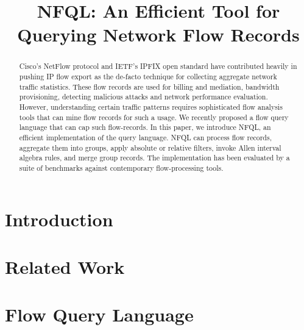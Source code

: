\documentclass[10pt, conference]{IEEEtran}
\begin{document}
\title{NFQL: An Efficient Tool for Querying Network Flow Records}
\author{ }

\maketitle

\begin{acronym}
\end{acronym}


\begin{abstract} Cisco's NetFlow protocol and IETF's IPFIX open standard have
  contributed heavily in pushing IP flow export as the de-facto technique for
  collecting aggregate network traffic statistics. These flow records are used
  for billing and mediation, bandwidth provisioning, detecting malicious
  attacks and network performance evaluation. However, understanding certain
  traffic patterns requires sophisticated flow analysis tools that can mine
  flow records for such a usage. We recently proposed a flow query language
  that can cap such flow-records. In this paper, we introduce NFQL, an
  efficient implementation of the query language.  NFQL can process flow
  records, aggregate them into groups, apply absolute or relative filters,
  invoke Allen interval algebra rules, and merge group records. The
  implementation has been evaluated by a suite of benchmarks against
  contemporary flow-processing tools.\end{abstract}



\section{Introduction}
\label{sec:introduction}
\section{Related Work}
\label{sec:relatedwork}
\section{Flow Query Language}
\label{sec:design}
\end{document}
